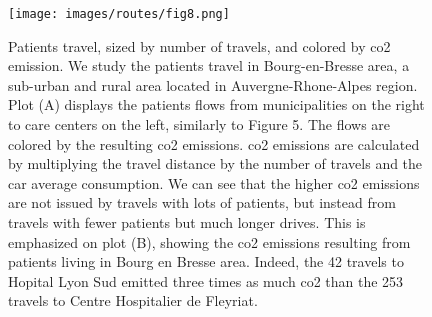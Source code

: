 \begin{figure}[h]
    \texttt{[image: images/routes/fig8.png]}
    \centering
    \caption{
        Patients travel, sized by number of travels, and colored by \ac{co2} emission. We study the patients travel in Bourg-en-Bresse area, a sub-urban and rural area located in Auvergne-Rhone-Alpes region. Plot (A) displays the patients flows from municipalities on the right to care centers on the left, similarly to Figure 5. The flows are colored by the resulting \ac{co2} emissions. \ac{co2} emissions are calculated by multiplying the travel distance by the number of travels and the car average consumption. We can see that the higher \ac{co2} emissions are not issued by travels with lots of patients, but instead from travels with fewer patients but much longer drives. This is emphasized on plot (B), showing the \ac{co2} emissions resulting from patients living in Bourg en Bresse area. Indeed, the 42 travels to Hopital Lyon Sud emitted three times as much \ac{co2} than the 253 travels to Centre Hospitalier de Fleyriat.
    }
    \label{fig:routes-co2-01}
\end{figure}
